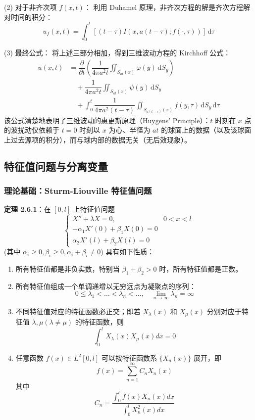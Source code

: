 \documentclass[12pt,a4paper]{ctexart}
\begin{document}
	(2) 对于非齐次项 $f(x,t)$：
	利用 Duhamel 原理，非齐次方程的解是齐次方程解对时间的积分：
	\[
	u_f(x,t) = \int_0^t \left[ (t-\tau) I(x, a(t-\tau); f(\cdot, \tau)) \right] \, \mathrm{d}\tau
	\]
	
	(3) 最终公式：
	将上述三部分相加，得到三维波动方程的 Kirchhoff 公式：
	\begin{align}
		u(x,t) &= \dfrac{\partial}{\partial t} \left( \dfrac{1}{4\pi a^2 t} \iint_{S_{at}(x)} \varphi(y) \, \mathrm{d}S_y \right) \nonumber \\
		&\quad + \dfrac{1}{4\pi a^2 t} \iint_{S_{at}(x)} \psi(y) \, \mathrm{d}S_y \nonumber \\
		&\quad + \int_0^t \dfrac{1}{4\pi a^2 (t-\tau)} \iint_{S_{a(t-\tau)}(x)} f(y,\tau) \, \mathrm{d}S_y \, \mathrm{d}\tau
		\label{eq:kirchhoff_final}
	\end{align}
	该公式清楚地表明了三维波动的惠更斯原理（Huygens' Principle）：$t$ 时刻在 $x$ 点的波扰动仅依赖于 $t=0$ 时刻以 $x$ 为心、半径为 $at$ 的球面上的数据（以及该球面上过去源项的积分），而与球内部的数据无关（无后效现象）。
	
	\subsection{特征值问题与分离变量}
	
	\subsubsection{理论基础：Sturm-Liouville 特征值问题}
	\textbf{定理 2.6.1}：在 $[0, l]$ 上特征值问题
	\begin{equation}
		\begin{cases}
			X'' + \lambda X = 0, & 0 < x < l \\
			-\alpha_1 X'(0) + \beta_1 X(0) = 0 \\
			\alpha_2 X'(l) + \beta_2 X(l) = 0
		\end{cases}
	\end{equation}
	(其中 $\alpha_i \ge 0, \beta_i \ge 0, \alpha_i + \beta_i \neq 0$) 具有如下性质：
	
	\begin{enumerate}
		\item[(a)] 所有特征值都是非负实数，特别当 $\beta_1 + \beta_2 > 0$ 时，所有特征值都是正数。
		\item[(b)] 所有特征值组成一个单调递增以无穷远点为凝聚点的序列：
		\[
		0 \le \lambda_1 < \dots < \lambda_n < \dots, \quad \lim_{n\to\infty} \lambda_n = \infty
		\]
		\item[(c)] 不同特征值对应的特征函数必正交；即若 $X_\lambda(x)$ 和 $X_\mu(x)$ 分别对应于特征值 $\lambda, \mu (\lambda \neq \mu)$ 的特征函数，则
		\[
		\int_0^l X_\lambda(x) X_\mu(x) dx = 0
		\]
		\item[(d)] 任意函数 $f(x) \in L^2[0, l]$ 可以按特征函数系 $\{X_n(x)\}$ 展开，即
		\[
		f(x) = \sum_{n=1}^{\infty} C_n X_n(x)
		\]
		其中
		\[
		C_n = \frac{\int_0^l f(x)X_n(x)dx}{\int_0^l X_n^2(x)dx}
		\]
	\end{enumerate}
	
\end{document}

